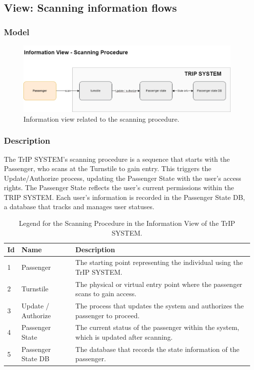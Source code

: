 \subsection{View: Scanning information flows}
\subsubsection{Model}
\begin{figure}[H]
    \centering
    \includegraphics[width=\textwidth]{drawings/views_final_version/information_view scanning.png}
    \caption{Information view related to the scanning procedure.}
    \label{fig:information_view_scanning}
\end{figure}

\subsubsection{Description}
The TrIP SYSTEM's scanning procedure is a sequence that starts with the Passenger, who scans at the Turnstile to gain entry. This triggers the Update/Authorize process, updating the Passenger State with the user's access rights. The Passenger State reflects the user's current permissions within the TRIP SYSTEM. Each user’s information is recorded in the Passenger State DB, a database that tracks and manages user statuses.

\begin{table}[H]
    \centering
    \caption{Legend for the Scanning Procedure in the Information View of the TrIP SYSTEM.}
    \label{tab:scanning_procedure_legend}
    \begin{tabular}{@{}llp{10cm}@{}}
    \toprule
    \textbf{Id} & \textbf{Name} & \textbf{Description} \\
    \midrule
    1 & Passenger & The starting point representing the individual using the TrIP SYSTEM. \\
    2 & Turnstile & The physical or virtual entry point where the passenger scans to gain access. \\
    3 & Update / Authorize & The process that updates the system and authorizes the passenger to proceed. \\
    4 & Passenger State & The current status of the passenger within the system, which is updated after scanning. \\
    5 & Passenger State DB & The database that records the state information of the passenger. \\
    \bottomrule
\end{tabular}
\end{table}

